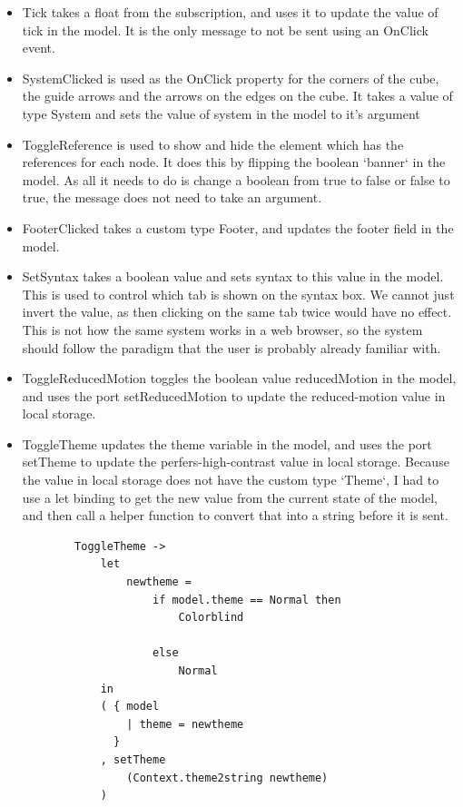\documentclass{l4proj}
\begin{document}
\begin{itemize}
    \item Tick takes a float from the subscription, and uses it to update the value of tick in the model.  It is the only message to not be sent using an OnClick event.

    \item SystemClicked is used as the OnClick property for the corners of the cube, the guide arrows and the arrows on the edges on the cube.  It takes a value of type System and sets the value of system in the model to it's argument

    \item ToggleReference is used to show and hide the element which has the references for each node.  It does this by flipping the boolean `banner` in the model.  As all it needs to do is change a boolean from true to false or false to true, the message does not need to take an argument.

    \item FooterClicked takes a custom type Footer, and updates the footer field in the model.

    \item SetSyntax takes a boolean value and sets syntax to this value in the model.  This is used to control which tab is shown on the syntax box.  We cannot just invert the value, as then clicking on the same tab twice would have no effect.  This is not how the same system works in a web browser, so the system should follow the paradigm that the user is probably already familiar with.

    \item ToggleReducedMotion toggles the boolean value reducedMotion in the model, and uses the port setReducedMotion to update the reduced-motion value in local storage.

    \item ToggleTheme updates the theme variable in the model, and uses the port setTheme to update the perfers-high-contrast value in local storage.  Because the value in local storage does not have the custom type `Theme`, I had to use a let binding to get the new value from the current state of the model, and then call a helper function to convert that into a string before it is sent.

    \begin{lstlisting}
        ToggleTheme ->
            let
                newtheme =
                    if model.theme == Normal then
                        Colorblind

                    else
                        Normal
            in
            ( { model
                | theme = newtheme
              }
            , setTheme
                (Context.theme2string newtheme)
            )
    \end{lstlisting}
\end{itemize}
\end{document}
